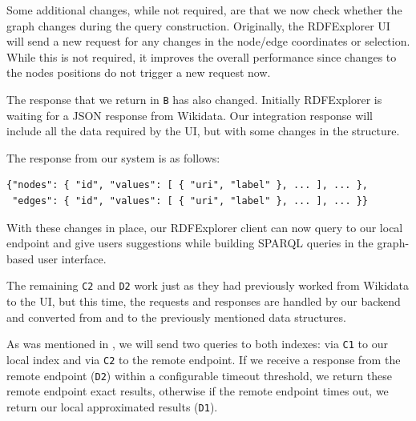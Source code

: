 Some additional changes, while not required, are that we now check whether the graph  changes during the query construction. Originally, the RDFExplorer UI will send a new request for any changes in the node/edge coordinates or selection. While this is not required, it improves the overall performance since changes to the nodes positions do not trigger a new request now. 

The response that we return in \texttt{B} has also changed. Initially RDFExplorer is waiting for a JSON response from Wikidata. Our integration response will include all the data required by the UI, but with some changes in the structure. 

The response from our system is as follows:
\begin{verbatim}
{"nodes": { "id", "values": [ { "uri", "label" }, ... ], ... },
 "edges": { "id", "values": [ { "uri", "label" }, ... ], ... }}
\end{verbatim}

With these changes in place, our RDFExplorer client can now query to our local endpoint and give users suggestions while building SPARQL queries in the graph-based user interface.

The remaining \texttt{C2} and \texttt{D2} work just as they had previously worked from Wikidata to the UI, but this time, the requests and responses are handled by our backend and converted from and to the previously mentioned data structures.

As was mentioned in , we will send two queries to both indexes: via \texttt{C1} to our local index and via \texttt{C2} to the remote endpoint. If we receive a response from the remote endpoint (\texttt{D2}) within a configurable timeout threshold, we return these remote endpoint exact results, otherwise if the remote endpoint times out, we return our local approximated results (\texttt{D1}).
